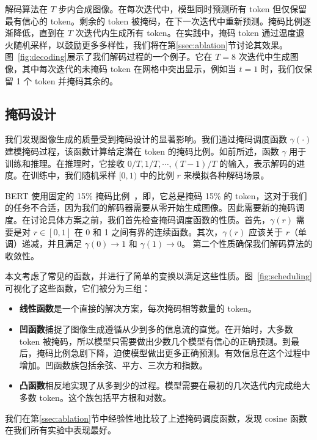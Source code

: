 解码算法在 $T$ 步内合成图像。在每次迭代中，模型同时预测所有 token 但仅保留最有信心的 token。剩余的 token 被掩码，在下一次迭代中重新预测。掩码比例逐渐降低，直到在 $T$ 次迭代内生成所有 token。在实践中，掩码 token 通过温度退火随机采样，以鼓励更多多样性，我们将在第\ref{ssec:ablation}节讨论其效果。图~\ref{fig:decoding}展示了我们解码过程的一个例子。它在 $T=8$ 次迭代中生成图像，其中每次迭代的未掩码 token 在网格中突出显示，例如当 $t=1$ 时，我们仅保留 1 个 token 并掩码其余的。

\subsection{掩码设计}
\label{ssec:masking}

我们发现图像生成的质量受到掩码设计的显著影响。我们通过掩码调度函数 $\gamma(\cdot)$ 建模掩码过程，该函数计算给定潜在 token 的掩码比例。如前所述，函数 $\gamma$ 用于训练和推理。在推理时，它接收 $0/T, 1/T, \cdots, (T-1)/T$ 的输入，表示解码的进度。在训练中，我们随机采样 $[0,1)$ 中的比例 $r$ 来模拟各种解码场景。

BERT 使用固定的 15\% 掩码比例~\cite{Devlin19bert}，即，它总是掩码 15\% 的 token，这对于我们的任务不合适，因为我们的解码器需要从零开始生成图像。因此需要新的掩码调度。在讨论具体方案之前，我们首先检查掩码调度函数的性质。首先，$\gamma(r)$ 需要是对 $r \in [0,1]$ 在 0 和 1 之间有界的连续函数。其次，$\gamma(r)$ 应该关于 $r$（单调）递减，并且满足 $\gamma(0)\rightarrow1$ 和 $\gamma(1)\rightarrow0$。
第二个性质确保我们解码算法的收敛性。


本文考虑了常见的函数，并进行了简单的变换以满足这些性质。图~\ref{fig:scheduling}可视化了这些函数，它们被分为三组：
\begin{itemize}
    \vspace{-2mm}
    \item \textbf{线性函数}是一个直接的解决方案，每次掩码相等数量的 token。
    \vspace{-2mm}
    \item \textbf{凹函数}捕捉了图像生成遵循从少到多的信息流的直觉。在开始时，大多数 token 被掩码，所以模型只需要做出少数几个模型有信心的正确预测。到最后，掩码比例急剧下降，迫使模型做出更多正确预测。有效信息在这个过程中增加。凹函数族包括余弦、平方、三次方和指数。
    \vspace{-2mm}
    \item \textbf{凸函数}相反地实现了从多到少的过程。模型需要在最初的几次迭代内完成绝大多数 token。这个族包括平方根和对数。

    \vspace{-2mm}
\end{itemize}

我们在第\ref{ssec:ablation}节中经验性地比较了上述掩码调度函数，发现 $\text{cosine}$ 函数在我们所有实验中表现最好。